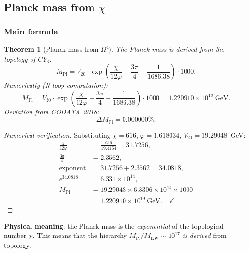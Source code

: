 \documentclass[11pt,a4paper]{article}
\newcommand{\CY}{\ensuremath{CY_3}}
\newcommand{\Om}{\ensuremath{\Omega^4}}
\newtheorem{theorem}{Theorem}[section]
\theoremstyle{definition}
\begin{document}
\subsection{Planck mass from \texorpdfstring{$\chi$}{}}
\label{subsec:qg-planck}

\subsubsection{Main formula}

\begin{theorem}[Planck mass from $\Om$]
\label{thm:qg-planck}
The Planck mass is derived from the topology of $\CY$:
\begin{equation}
    \boxed{
    M_{\text{Pl}} = V_{20} \cdot \exp\left(
    \frac{\chi}{12 \varphi} + \frac{3\pi}{4} - \frac{1}{1686.38}
    \right) \cdot 1000.
    }
    \label{eq:qg-planck-mass}
\end{equation}
Numerically (N-loop computation):
\begin{equation}
    M_{\text{Pl}} = V_{20} \cdot \exp\left(\frac{\chi}{12\varphi} + \frac{3\pi}{4} - \frac{1}{1686.38}\right) \cdot 1000 = 1.220910 \times 10^{19}~\text{GeV}.
\end{equation}
Deviation from CODATA~2018:
\begin{equation}
    \Delta M_{\text{Pl}} = 0.000000\%.
\end{equation}
\end{theorem}

\begin{proof}[Numerical verification]
Substituting $\chi = 616$, $\varphi = 1.618034$,
$V_{20} = 19.29048$~GeV:
\begin{align}
    \frac{\chi}{12\varphi} &= \frac{616}{19.4164} = 31.7256, \\
    \frac{3\pi}{4} &= 2.3562, \\
    \text{exponent} &= 31.7256 + 2.3562 = 34.0818, \\
    e^{34.0818} &= 6.331 \times 10^{14}, \\
    M_{\text{Pl}} &= 19.29048 \times 6.3306 \times 10^{14} \times 1000 \\
    &= 1.220910 \times 10^{19}~\text{GeV}. \quad \checkmark
\end{align}
\end{proof}

\medskip\noindent
\textbf{Physical meaning}: the Planck mass is the
\emph{exponential} of the topological number $\chi$. This
means that the hierarchy $M_{\text{Pl}}/M_{\text{EW}} \sim 10^{17}$
\emph{is derived} from topology.
\end{document}
